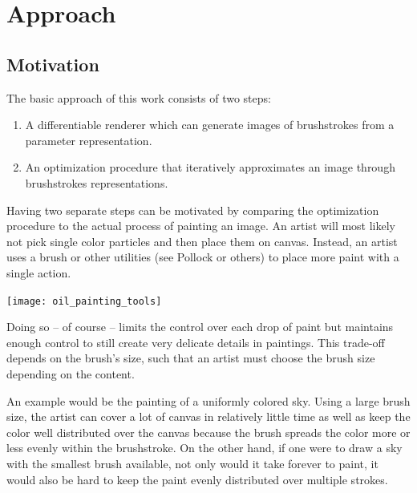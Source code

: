 \setchapterpreamble[u]{\margintoc}
\chapter{Approach}


\section{Motivation}


The basic approach of this work consists of two steps:
\begin{enumerate}
    \item A differentiable renderer which can generate images of brushstrokes from a parameter representation.
    \item An optimization procedure that iteratively approximates an image through brushstrokes representations.
\end{enumerate}

Having two separate steps can be motivated by comparing the optimization procedure to the actual process of painting an image.
An artist will most likely not pick single color particles and then place them on canvas.
Instead, an artist uses a brush or other utilities (see Pollock or others) to place more paint with a single action.

\begin{marginfigure}
    \texttt{[image: oil\_painting\_tools]}
    \caption[]{A typical set of brushes and spatulas used for oil paintings.
    }
\end{marginfigure}
Doing so -- of course -- limits the control over each drop of paint but maintains enough control to still create very delicate details in paintings.
This trade-off depends on the brush's size, such that an artist must choose the brush size depending on the content.

An example would be the painting of a uniformly colored sky.
Using a large brush size, the artist can cover a lot of canvas in relatively little time as well as keep the color well distributed over the canvas because the brush spreads the color more or less evenly within the brushstroke.
On the other hand, if one were to draw a sky with the smallest brush available, not only would it take forever to paint, it would also be hard to keep the paint evenly distributed over multiple strokes.

